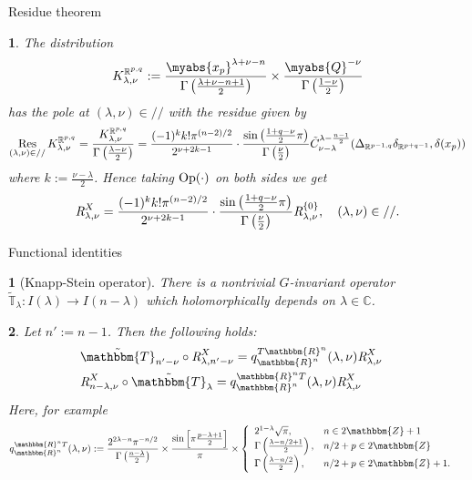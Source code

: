 \documentclass[8pt,notes,notheorems]{beamer}
\newcommand{\assign}{:=}
\newcommand{\Op}{\mbox{\normalfont Op}}
\newcommand{\Res}{\operatorname{Res}\displaylimits}
\newcommand{\OpR}{\mbox{\it R}}
\newtheorem{theorem}{\translate{Theorem}}[section]
\newtheorem{theorem}{\translate{Theorem}}
\newtheorem{fact}{\translate{Fact}}
\theoremstyle{definition}
\theoremstyle{example}
\theoremstyle{plain}
\theoremstyle{mystyle}
\begin{document}
\begin{frame}{Residue theorem}
	\begin{theorem}
		The distribution
		\[K_{\lambda,\nu}^{\mathbb{R}^{p,q}}:=\frac{\myabs{x_p}^{\lambda+\nu-n}}{\Gamma\left( \frac{\lambda+\nu-n+1}{2} \right)}\times
		\frac{\myabs{Q}^{-\nu}}{\Gamma\left( \frac{1-\nu}{2} \right)}\]
		has the pole at $(\lambda,\nu)\in//$ with the residue given by
		\[\Res_{(\lambda,\nu)\in//}K_{\lambda,\nu}^{\mathbb{R}^{p,q}}=\frac{K_{\lambda,\nu}^{\mathbb{R}^{p,q}}}{\Gamma\left( \frac{\lambda-\nu}{2} \right)}
			=\frac{ (- 1)^k k!\pi^{(n - 2) / 2} 
		}{2^{ \nu + 2 k-1}}\cdot  \frac{\sin\left( \frac{1+q-\nu}{2}\pi \right)}{\Gamma\left( \frac{\nu}{2} \right)}
	\tilde{C}_{\nu - \lambda}^{\lambda - \frac{n
  	- 1}{2}} ({\Delta}_{\mathbb{R}^{p-1,q}} {\delta}_{\mathbb{R}^{p+q-1}}, \delta (x_p))
		\]
		where $k:=\frac{\nu-\lambda}{2}$.
		Hence taking $\Op(\cdot)$ on both sides we get
  \[\OpR_{\lambda,\nu}^X  = \frac{ (- 1)^k k!\pi^{(n - 2) / 2} 
		}{2^{ \nu + 2 k-1}}\cdot  \frac{\sin\left( \frac{1+q-\nu}{2}\pi \right)}{\Gamma\left( \frac{\nu}{2} \right)}
     \OpR_{\lambda,\nu}^{ \left\{ 0 \right\} },\quad(\lambda,\nu)\in// . \]
	\end{theorem}
\end{frame}
\begin{frame}{Functional identities}
	\begin{fact}[Knapp-Stein operator]
		There is a nontrivial $G$-invariant operator $\tilde{\mathbb{T}}_{\lambda}:I(\lambda)\to I(n-\lambda)$ which holomorphically depends on $\lambda\in \mathbb{C}$.
	\end{fact}
	\begin{theorem}
		Let $n':=n-1$. Then the following holds:
\begin{eqnarray}
	& \tilde{\mathbbm{T}}_{n' - \nu} \circ \OpR^X_{\lambda,n'-\nu}= q^{T\mathbbm{R}^n}_{\mathbbm{R}^n} (\lambda,
  \nu) \OpR^X_{\lambda,\nu} &  \nonumber\\
  & \OpR^X_{n-\lambda,\nu} \circ
  \tilde{\mathbbm{T}}_{\lambda} = q^{\mathbbm{R}^n T}_{\mathbbm{R}^n}
  (\lambda, \nu) \OpR^X_{\lambda,\nu} & \nonumber
\end{eqnarray}
\pause
Here, for example
\begin{eqnarray}
  & q^{\mathbbm{R}^n T}_{\mathbbm{R}^n} (\lambda, \nu) \assign \frac{2^{2
  \lambda - n} \pi^{- n / 2}}{\Gamma \left( \frac{n - \lambda}{2} \right)}
  \times \frac{\sin \left[ \pi \frac{p - \lambda + 1}{2} \right]}{\pi} \times
  \left\{ \begin{array}{ll}
    2^{1 - \lambda} \sqrt{\pi}, & n \in 2\mathbbm{Z}+ 1\\
    \Gamma \left( \frac{\lambda - n / 2 + 1}{2} \right), & n / 2 + p \in
    2\mathbbm{Z}\\
    \Gamma \left( \frac{\lambda - n / 2}{2} \right), & n / 2 + p \in
    2\mathbbm{Z}+ 1.
  \end{array} \right. &  \nonumber
\end{eqnarray}
	\end{theorem}
\end{frame}
\begin{frame}
	{\footnotesize
}
\end{frame}
\end{document}
